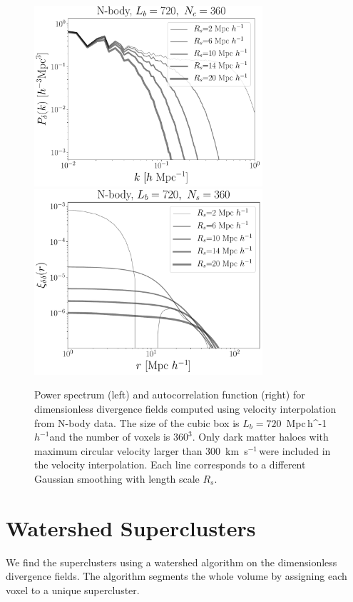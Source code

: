 \documentclass[usenatbib]{mnras}
\newcommand{\Mpch}{\,{\rm Mpc}\,\ifmmode h^{-1}\else $h^{-1}$\fi}
\newcommand{\kms}{\,{\rm km}\ s$^{-1}$\,}
\begin{document}
\begin{figure}
    \centering
    \includegraphics[width=240pt]{power_spectrum_nbody_720_360.pdf}
    \includegraphics[width=240pt]{corr_func_nbody_720_360.pdf}
    \caption{Power spectrum (left) and autocorrelation function (right) for dimensionless divergence fields computed using velocity interpolation from N-body data.
    The size of the cubic box is $L_b=720$ \Mpch and the number of voxels is $360^3$.
    Only dark matter haloes with maximum circular velocity larger than $300$ \kms were included in the velocity interpolation.
    Each line corresponds to a different Gaussian smoothing with length scale $R_s$.}
    \label{fig:nbody}
\end{figure}



\section{Watershed Superclusters}
\label{sec:watershed}

We find the superclusters using a watershed algorithm \citep{BeucherWatershed1979} on the dimensionless divergence fields.
The algorithm segments the whole volume by assigning each voxel to a unique supercluster. 
\end{document}

